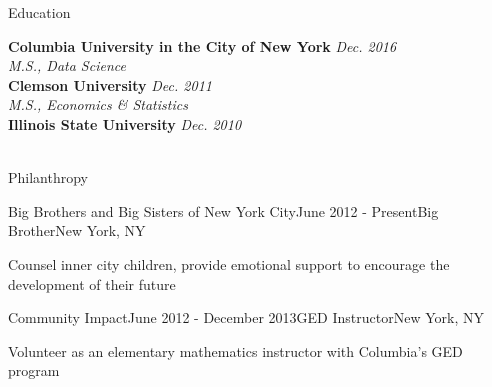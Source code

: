\documentclass{resume} %
\begin{document}
\vspace{-0.4cm}
\begin{rSection}{Education}

{\bf Columbia University in the City of New York} \hfill {\em Dec. 2016} \\ 
{\em  M.S., Data Science} \\
{\bf Clemson University} \hfill {\em Dec. 2011} \\ 
{\em M.S., Economics \& Statistics} \\
{\bf Illinois State University} \hfill {\em Dec. 2010} \\ 
\indent {} \\
\end{rSection}

\vspace{-0.6cm}
\begin{rSection}{Philanthropy}
\begin{rSubsection}{Big Brothers and Big Sisters of New York City}{June 2012 - Present}{Big Brother}{New York, NY}
\item Counsel inner city children, provide emotional support to encourage the development of their future
\end{rSubsection}

\begin{rSubsection}{Community Impact}{June 2012 - December 2013}{GED Instructor}{New York, NY}
\item Volunteer as an elementary mathematics instructor with Columbia's GED program
\end{rSubsection}

\end{rSection}





\end{document}

